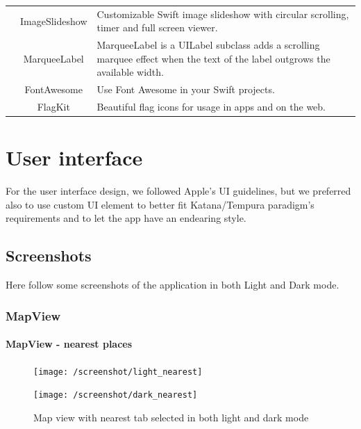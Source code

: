 \documentclass[a4paper, 11pt, parskip=half]{scrreprt}
\theoremstyle{definition}
\begin{document}
\begin{table}[h]
\begin{tabular}{|c|c|m{9cm}|}
        & ImageSlideshow & Customizable Swift image slideshow with circular scrolling, timer and full screen viewer. \\ \cline{2-3}
        & MarqueeLabel & MarqueeLabel is a UILabel subclass adds a scrolling marquee effect when the text of the label outgrows the available width. \\ \cline{2-3}
        & FontAwesome & Use Font Awesome in your Swift projects. \\ \cline{2-3}
        & FlagKit & Beautiful flag icons for usage in apps and on the web. \\ \hline
    \end{tabular}
\end{table}

\chapter{User interface}
For the user interface design, we followed Apple's UI guidelines, but we preferred also to use custom UI element to better fit Katana/Tempura paradigm's requirements and to let the app have an endearing style.  

\section{Screenshots}
Here follow some screenshots of the application in both Light and Dark mode.

\subsection{MapView}

\subsubsection{MapView - nearest places}

\begin{figure}[H]
	\centering
	\begin{minipage}{.5\textwidth}
  	\centering
  	\texttt{[image: /screenshot/light\_nearest]}
  	\label{fig:test1}
	\end{minipage}%
	\begin{minipage}{.5\textwidth}
  	\centering
  	\texttt{[image: /screenshot/dark\_nearest]}
  	\label{fig:test2}
	\end{minipage}
	\caption{Map view with nearest tab selected in both light and dark mode}
\end{figure}
\end{document}
